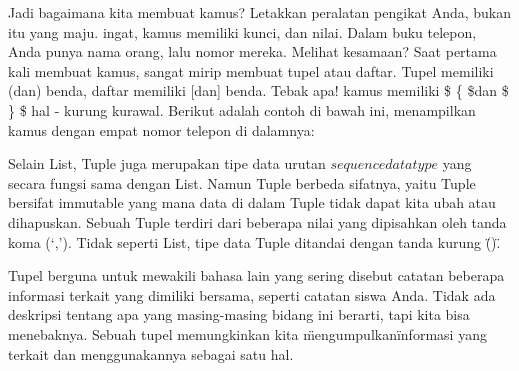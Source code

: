 Jadi bagaimana kita membuat kamus? Letakkan peralatan pengikat Anda, bukan itu yang maju. ingat, kamus memiliki kunci, dan nilai. Dalam buku telepon, Anda punya nama orang, lalu nomor mereka. Melihat kesamaan? Saat pertama kali membuat kamus, sangat mirip membuat tupel atau daftar. Tupel memiliki (dan) benda, daftar memiliki [dan] benda. Tebak apa! kamus memiliki \$  \{  \$dan \$  \}  \$ hal - kurung kurawal. Berikut adalah contoh di bawah ini, menampilkan kamus dengan empat nomor telepon di dalamnya: 

Selain List, Tuple juga merupakan tipe data urutan \(sequence data type\) yang secara fungsi sama dengan List. Namun Tuple berbeda sifatnya, yaitu Tuple bersifat immutable yang mana data di dalam Tuple tidak dapat kita ubah atau dihapuskan. Sebuah Tuple terdiri dari beberapa nilai yang dipisahkan oleh tanda koma (‘,’). Tidak seperti List, tipe data Tuple ditandai dengan tanda kurung \"()\".

Tupel berguna untuk mewakili bahasa lain yang sering disebut catatan \- beberapa informasi terkait yang dimiliki bersama, seperti catatan siswa Anda. Tidak ada deskripsi tentang apa yang masing-masing bidang ini berarti, tapi kita bisa menebaknya. Sebuah tupel memungkinkan kita \"mengumpulkan\" informasi yang terkait dan menggunakannya sebagai satu hal.
